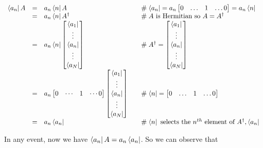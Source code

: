 \documentclass[11pt, oneside]{article}   	%
\begin{document}
\begin{equation*}
\begin{array}{rcll}
 \bra{a_n} A
&=& a_n \bra{n} A  
    & \quad \mathrel{\#} \bra{a_n}   =  a_n \begin{bmatrix} 0 & \hdots & 1 & \hdots 0 \end{bmatrix} = a_n \bra{n}    \\
&=& a_n \bra{n} A^{\dagger}
    & \quad \mathrel{\#} \text{$A$ is Hermitian so $A = A^{\dagger}$}    \\
&=& a_n \bra{n} \begin{bmatrix} \bra{a_1}  \\  \vdots \\ \bra{a_n} \\ \vdots \\  \bra{a_N}  \end{bmatrix}      
    & \quad \mathrel{\#}  A^{\dagger} =  \begin{bmatrix} \bra{a_1}  \\  \vdots \\ \bra{a_n} \\ \vdots \\  \bra{a_N}  \end{bmatrix}  \\
&=& a_n \begin{bmatrix} 0 & \cdots & 1 & \cdots 0 \end{bmatrix}  \begin{bmatrix} \bra{a_1}  \\  \vdots \\ \bra{a_n} \\ \vdots \\  \bra{a_N}  \end{bmatrix}  
    & \quad \mathrel{\#}  \bra{n}  = \begin{bmatrix} 0 & \hdots & 1 & \hdots 0 \end{bmatrix}  \\
&=& a_n \bra{a_n} 
    & \quad \mathrel{\#}  \bra{n} \text{ selects the $n^{th}$ element of $A^{\dagger}, \bra{a_n}$}
\end{array}
\end{equation*}

\bigskip
\noindent
In any event, now we have $\bra{a_n} A = a_n \bra{a_n}$. So we can observe that 
\end{document}
